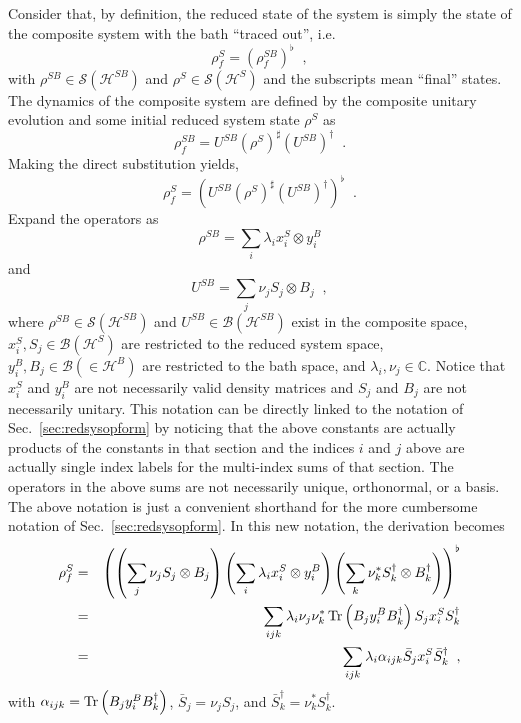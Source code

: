 Consider that, by definition, the reduced state of the system is simply the state of the composite system with the bath ``traced out'', i.e.\
$$
\rho^S_f = \left(\rho^{SB}_f\right)^\flat\;\;,
$$
with $\rho^{SB}\in\mathcal{S}(\mathcal{H}^{SB})$ and $\rho^S\in\mathcal{S}(\mathcal{H}^S)$ and the subscripts mean ``final'' states.  The dynamics of the composite system are defined by the composite unitary evolution and some initial reduced system state $\rho^S$ as
$$
\rho^{SB}_f = U^{SB} \left(\rho^{S}\right)^\sharp \left(U^{SB}\right)^\dagger\;\;.
$$
Making the direct substitution yields,
\begin{equation}
\rho^{S}_f = \left(U^{SB} \left(\rho^{S}\right)^\sharp \left(U^{SB}\right)^\dagger\right)^\flat\;\;.
\end{equation}
Expand the operators as
\begin{equation}
\rho^{SB} = \sum_i \lambda_i x_i^S \otimes y_i^B
\end{equation}
and
\begin{equation}
U^{SB} = \sum_j \nu_j S_j \otimes B_j\;\;,
\end{equation}
where $\rho^{SB}\in\mathcal{S}(\mathcal{H}^{SB})$ and $U^{SB}\in\mathcal{B}(\mathcal{H}^{SB})$ exist in the composite space, $x^S_i,S_j\in\mathcal{B}(\mathcal{H}^S)$ are restricted to the reduced system space, $y^B_i,B_j\in\mathcal{B}(\in\mathcal{H}^B)$ are restricted to the bath space, and $\lambda_i,\nu_j\in\mathbb{C}$.  Notice that $x_i^S$ and $y_i^B$ are not necessarily valid density matrices and $S_j$ and $B_j$ are not necessarily unitary.  This notation can be directly linked to the notation of Sec.\ \ref{sec:redsysopform} by noticing that the above constants are actually products of the constants in that section and the indices $i$ and $j$ above are actually single index labels for the multi-index sums of that section.  The operators in the above sums are not necessarily unique, orthonormal, or a basis.  The above notation is just a convenient shorthand for the more cumbersome notation of Sec.\ \ref{sec:redsysopform}.  In this new notation, the derivation becomes
\begin{eqnarray}
\label{eqn:notationref}
\rho^S_f &=& \left( \left( \sum_j \nu_j S_j\otimes B_j\right)\left( \sum_i \lambda_i x_i^S\otimes y_i^B\right)\left(\sum_k \nu_k^* S_k^\dagger \otimes B_k^\dagger\right)\right)^\flat\\
&=& \sum_{ijk} \lambda_i \nu_j \nu_k^* \operatorname{Tr}\left(B_j y_i^B B_k^\dagger\right) S_j x_i^S S_k^\dagger\\
&=& \sum_{ijk} \lambda_i \alpha_{ijk} \bar{S}_j x_i^S \bar{S}_k^\dagger\;\;,
\end{eqnarray}
with $\alpha_{ijk} = \operatorname{Tr}\left(B_j y_i^B B_k^\dagger\right)$, $\bar{S}_j = \nu_j S_j$, and $\bar{S}_k^\dagger = \nu_k^* S_k^\dagger$.  

